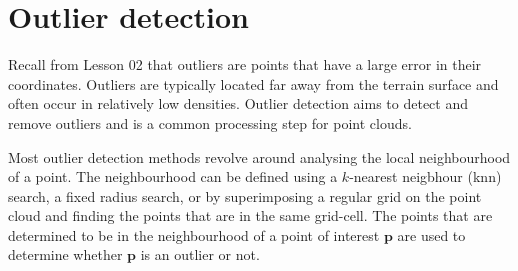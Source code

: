 \section{Outlier detection}
Recall from Lesson 02 that outliers are points that have a large error in their coordinates.
Outliers are typically located far away from the terrain surface and often occur in relatively low densities.
Outlier detection aims to detect and remove outliers and is a common processing step for point clouds.

Most outlier detection methods revolve around analysing the local neighbourhood of a point.
The neighbourhood can be defined using a $k$-nearest neigbhour (knn) search, a fixed radius search, or by superimposing a regular grid on the point cloud and finding the points that are in the same grid-cell.
The points that are determined to be in the neighbourhood of a point of interest $\mathbf{p}$ are used to determine whether $\mathbf{p}$ is an outlier or not.

